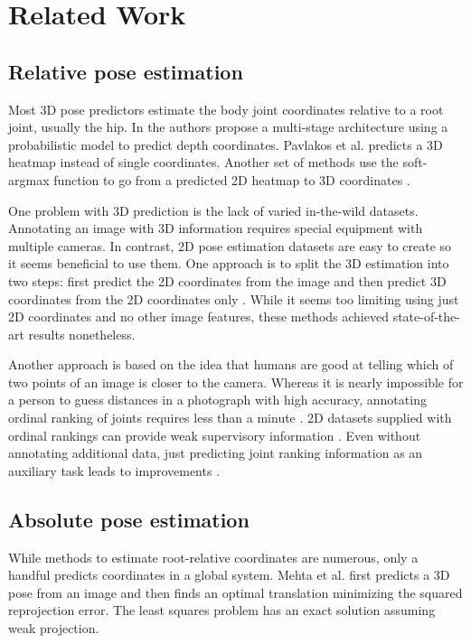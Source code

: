 \documentclass[conference]{IEEEtran}
\begin{document}
\section{Related Work}\label{sec:rel_works}
\subsection{Relative pose estimation} Most 3D pose predictors estimate the body joint coordinates relative to a root joint, usually the hip. In \cite{tome2017liftingfromdeep} the authors propose a multi-stage architecture using a probabilistic model to predict depth coordinates. Pavlakos et al. \cite{gorog} predicts a 3D heatmap instead of single coordinates. Another set of methods use the soft-argmax function to go from a predicted 2D heatmap to 3D coordinates \cite{integralPose,Luvizon2018softargmax}. 

One problem with 3D prediction is the lack of varied in-the-wild datasets. Annotating an image with 3D information requires special equipment with multiple cameras. In contrast, 2D pose estimation datasets are easy to create so it seems beneficial to use them. One approach is to split the 3D estimation into two steps: first predict the 2D coordinates from the image and then predict 3D coordinates from the 2D coordinates only \cite{3dbaseline,fang2018posegrammar,lee2018pLSTM,veges2018siamese}. While it seems too limiting using just 2D coordinates and no other image features, these methods achieved state-of-the-art results nonetheless.

Another approach is based on the idea that humans are good at telling which of two points of an image is closer to the camera. Whereas it is nearly impossible for a person to guess distances in a photograph with high accuracy, annotating ordinal ranking of joints requires less than a minute \cite{pavlakos2018ordinal}. 2D datasets supplied with ordinal rankings can provide weak supervisory information \cite{pavlakos2018ordinal,fbipose,ronchi2018allrelative}. Even without annotating additional data, just predicting joint ranking information as an auxiliary task leads to improvements \cite{drpose}.

\subsection{Absolute pose estimation} While methods to estimate root-relative coordinates are numerous, only a handful predicts coordinates in a global system. Mehta et al. \cite{mehta} first predicts a 3D pose from an image and then finds an optimal translation minimizing the squared reprojection error. The least squares problem has an exact solution assuming weak projection.
\end{document}
